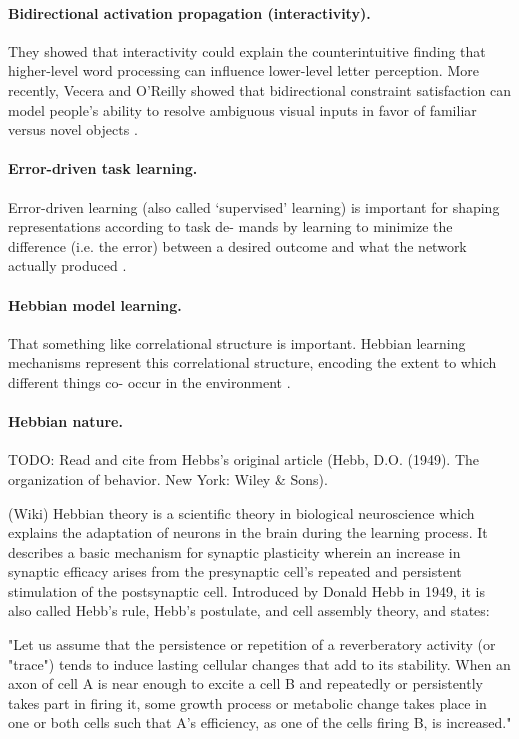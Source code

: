\paragraph{Bidirectional activation propagation (interactivity).} They showed that
interactivity could explain the counterintuitive finding that
higher-level word processing can influence lower-level letter
perception. More recently, Vecera and O’Reilly showed
that bidirectional constraint satisfaction can model people’s
ability to resolve ambiguous visual inputs in favor of familiar
versus novel objects \cite{hinton1988learning}. 

\paragraph{Error-driven task learning.} Error-driven learning (also called ‘supervised’ learning) is
important for shaping representations according to task de-
mands by learning to minimize the difference (i.e. the error)
between a desired outcome and what the network actually
produced \cite{hinton1988learning}. 

\paragraph{Hebbian model learning.} That something like correlational structure is important.
Hebbian learning mechanisms represent this correlational
structure, encoding the extent to which different things co-
occur in the environment \cite{hinton1988learning}.


\paragraph{Hebbian nature.}

TODO: Read and cite from Hebbs's original article (Hebb, D.O. (1949). The organization of behavior. New York: Wiley \& Sons). 

(Wiki) Hebbian theory is a scientific theory in biological neuroscience which explains the adaptation of neurons in the brain during the learning process. It describes a basic mechanism for synaptic plasticity wherein an increase in synaptic efficacy arises from the presynaptic cell's repeated and persistent stimulation of the postsynaptic cell. Introduced by Donald Hebb in 1949, it is also called Hebb's rule, Hebb's postulate, and cell assembly theory, and states:

    "Let us assume that the persistence or repetition of a reverberatory activity (or "trace") tends to induce lasting cellular changes that add to its stability. When an axon of cell A is near enough to excite a cell B and repeatedly or persistently takes part in firing it, some growth process or metabolic change takes place in one or both cells such that A's efficiency, as one of the cells firing B, is increased."

